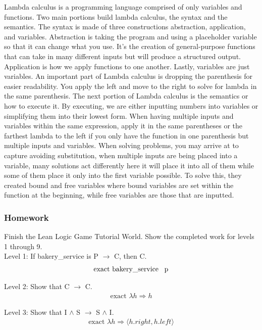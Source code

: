 \documentclass{article}
\theoremstyle{theorem}
\theoremstyle{definition}
\theoremstyle{remark}
\begin{document}
Lambda calculus is a programming language comprised of only variables and functions. Two main portions build lambda calculus, the syntax and the semantics. The syntax is made of three constructions abstraction, application, and variables. Abstraction is taking the program and using a placeholder variable so that it can change what you use. It's the creation of general-purpose functions that can take in many different inputs but will produce a structured output. Application is how we apply functions to one another. Lastly, variables are just variables. An important part of Lambda calculus is dropping the parenthesis for easier readability. You apply the left and move to the right to solve for lambda in the same parenthesis. The next portion of Lambda calculus is the semantics or how to execute it. By executing, we are either inputting numbers into variables or simplifying them into their lowest form. When having multiple inputs and variables within the same expression, apply it in the same parentheses or the farthest lambda to the left if you only have the function in one parenthesis but multiple inputs and variables. When solving problems, you may arrive at to capture avoiding substitution, when multiple inputs are being placed into a variable, many solutions act differently here it will place it into all of them while some of them place it only into the first variable possible. To solve this, they created bound and free variables where bound variables are set within the function at the beginning, while free variables are those that are inputted. 

\subsubsection{Homework}

Finish the Lean Logic Game Tutorial World. Show the completed work for levels 1 through 9. \\

Level 1: If bakery\_service is P $\rightarrow$ C, then C.
\begin{align*}
  \text{exact bakery\_service \, p}
\end{align*}

Level 2: Show that C $\rightarrow$ C.
\begin{align*}
  \text{exact } \lambda h \Rightarrow h
\end{align*}

Level 3: Show that I $\wedge$ S $\rightarrow$ S $\wedge$ I.
\begin{align*}
  \text{exact } \lambda h \Rightarrow \langle h.right , h.left\rangle
\end{align*}
\end{document}
